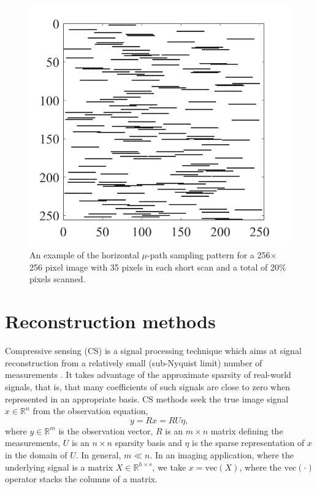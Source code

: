 \documentclass[journal]{IEEEtran}
\begin{document}
\begin{figure}
  \centering
  \includegraphics[width=0.65\columnwidth]{figures-SBA/random_mask.pdf}
  \caption{An example of the horizontal $\mu$-path sampling pattern
    for a 256$\times$256 pixel image with 35 pixels in each short scan
    and a total of 20\% pixels scanned.}
  \label{fig:mu_mask}
\end{figure}
\section{Reconstruction methods}
\label{sec:reconstructionMethods}
Compressive sensing (CS) is a signal processing technique which aims
at signal reconstruction from a relatively small (sub-Nyquist limit)
number of measurements \cite{carmi2014compressive}. It takes advantage
of the approximate sparsity of real-world signals, that is, that many
coefficients of such signals are close to zero when represented in an
appropriate basis. CS methods seek the true image signal
$x\in\mathbb{R}^n$ from the observation equation,
\begin{equation}\label{op:observation}
  y = R x = RU\eta,
\end{equation}
\noindent where $y\in\mathbb{R}^m$ is the observation vector, $R$ is
an $m\times n$ matrix defining the measurements, $U$ is an $n\times n$
sparsity basis and $\eta$ is the sparse representation of $x$ in the
domain of $U$. In general, $m\ll n$. In an imaging application, where
the underlying signal is a matrix $X\in\mathbb{R}^{h\times s}$, we
take $x=\text{vec}(X)$, where the $\text{vec}(\cdot)$ operator stacks
the columns of a matrix.
\end{document}
